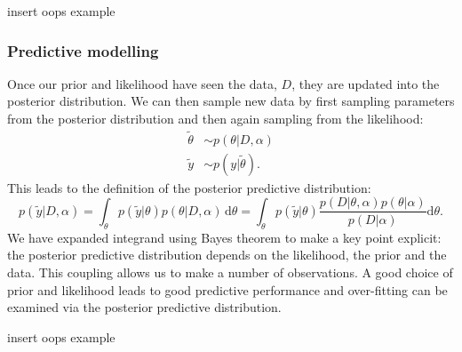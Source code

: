 \documentclass[12pt,english]{article}
\begin{document}
insert oops example

\subsubsection{Predictive modelling}
Once our prior and likelihood have seen the data, $D$, they are updated into the posterior distribution. We can then sample new data by first sampling parameters from the posterior distribution and then again sampling from the likelihood:
\begin{equation}
	\begin{split}
		\tilde{\theta} &\sim p(\theta|D, \alpha) \\
		\tilde{y} & \sim p(y|\tilde{\theta}).
	\end{split}
\end{equation}  
This leads to the definition of the posterior predictive distribution:
\begin{equation}
	p(\tilde{y}|D, \alpha) = \int_{\theta} p(\tilde{y}|\theta)p(\theta|D, \alpha)\, \text{d}\theta = \int_{\theta}p(\tilde{y}|\theta) \frac{p(D|\theta, \alpha)p(\theta|\alpha)}{p(D|\alpha)} \text{d}\theta.
\end{equation}
We have expanded integrand using Bayes theorem to make a key point explicit: the posterior predictive distribution depends on the likelihood, the prior and the data. This coupling allows us to make a number of observations. A good choice of prior and likelihood leads to good predictive performance and over-fitting can be examined via the posterior predictive distribution. 

insert oops example
\end{document}
